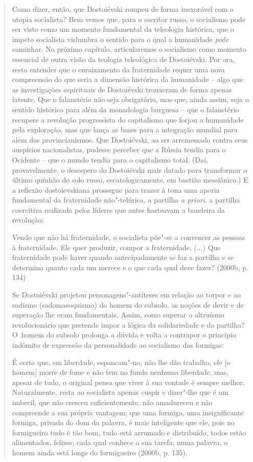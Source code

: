 {\begin{quote}
Como dizer, então, que Dostoiévski rompeu de forma inexorável com a
utopia socialista? Bem vemos que, para o escritor russo, o socialismo
pode ser visto como um momento fundamental da teleologia histórica, que
o ímpeto socialista vislumbra o sentido para o qual a humanidade
\emph{pode} caminhar. No próximo capítulo, articularemos o socialismo
como momento essencial de outra visão da teologia teleológica de
Dostoiévski. Por ora, resta entender que o enraizamento da fraternidade
requer uma nova compreensão do que seria a dimensão histórica da
humanidade -- algo que as investigações espirituais de Dostoiévski
trouxeram de forma apenas latente. Que o falanstério não seja
obrigatório, mas que, ainda assim, seja o sentido histórico para além da
monadologia burguesa -- que o falanstério recupere a revolução
progressista do capitalismo que forjou a humanidade pela exploração, mas
que lança as bases para a integração mundial para além dos
provincianismos. Que Dostoiévski, ao ser arremessado contra seus
auspícios nacionalistas, pudesse perceber que a Rússia tendia para o
Ocidente -- que o mundo tendia para o capitalismo total. (Daí,
provavelmente, o desespero do Dostoiévski mais datado para transformar o
último quinhão do solo russo, escatologicamente, em bastião messiânico.)
E a reflexão dostoievskiana prossegue para trazer à tona uma aporia
fundamental da fraternidade não"-telúrica, a partilha \emph{a priori}, a
partilha coercitiva realizada pelos líderes que antes hasteavam a
bandeira da revolução:

Vendo que não há fraternidade, o socialista põe"-se a convencer as
pessoas à fraternidade. Ele quer produzir, compor a fraternidade. (...)
Que fraternidade pode haver quando antecipadamente se faz a partilha e
se determina quanto cada um merece e o que cada qual deve fazer? (2000b,
p. 134)

Se Dostoiévski projetou personagens"-antíteses em relação ao torpor e ao
sadismo (sadomasoquismo) do homem do subsolo, as noções de devir e de
superação lhe eram fundamentais. Assim, como superar o altruísmo
revolucionário que pretende impor a lógica da solidariedade e da
partilha? O~homem do subsolo prolonga a dúvida e volta a contrapor o
princípio indômito de expressão da personalidade ao socialismo das
formigas:

É certo que, em liberdade, espancam"-no, não lhe dão trabalho, ele {[}o
homem{]} morre de fome e não tem no fundo nenhuma liberdade, mas, apesar
de tudo, o original pensa que viver à sua vontade é sempre melhor.
Naturalmente, resta ao socialista apenas cuspir e dizer"-lhe que é um
imbecil, que não cresceu suficientemente, não amadureceu e não
compreende a sua própria vantagem; que uma formiga, uma insignificante
formiga, privada do dom da palavra, é mais inteligente que ele, pois no
formigueiro tudo é tão bom, tudo está arrumado e distribuído, todos
estão alimentados, felizes, cada qual conhece a sua tarefa; numa
palavra, o homem ainda está longe do formigueiro (2000b, p. 135).


\end{quote}}

